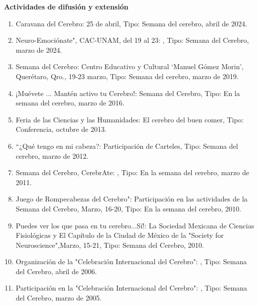 \textbf{Actividades de difusión y extensión}

\hfill

\begin{enumerate}

\item Caravana del Cerebro: 25 de abril, Tipo: Semana del cerebro, abril de 2024.

\item Neuro-Emociónate", CAC-UNAM, del 19 al 23: , Tipo: Semana del Cerebro, marzo de 2024.

\item Semana del Cerebro: Centro Educativo y Cultural ‘Manuel Gómez Morin’, Querétaro, Qro., 19-23 marzo, Tipo: Semana del 
cerebro, marzo de 2019.

\item ¡Muévete ... Mantén activo tu Cerebro!: Semana del Cerebro, Tipo: En la semana del cerebro, marzo de 2016.

\item Feria de las Ciencias y las Humanidades: El cerebro del buen comer, Tipo: Conferencia, octubre de 2013.

\item “¿Qué tengo en mi cabeza?: Participación de Carteles, Tipo: Semana del cerebro, marzo de 2012.

\item Semana del Cerebro, CerebrAte: , Tipo: En la semana del cerebro, marzo de 2011.

\item Juego de Rompecabezas del Cerebro": Participación en las actividades de la Semana del Cerebro, Marzo, 16-20, Tipo: En 
la 
semana del cerebro, 2010.

\item Puedes ver los que pasa en tu cerebro...Sí!: La Sociedad Mexicana de Ciencias Fisiológicas y El Capítulo de la Ciudad 
de 
México de la "Society for Neuroscience",Marzo, 15-21, Tipo: Semana del Cerebro, 2010.

\item Organización de la "Celebración Internacional del Cerebro": , Tipo: Semana del Cerebro, abril de 2006.

\item Participación en la "Celebración Internacional del Cerebro": , Tipo: Semana del Cerebro, marzo de 2005.

\end{enumerate}
